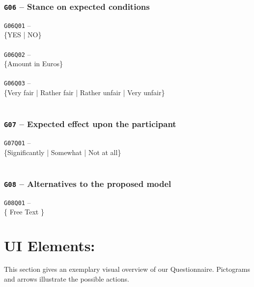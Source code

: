 \subsubsection{\texttt{G06} -- Stance on expected conditions}
\begin{displayquote}
    \texttt{G06Q01} -- \\
    \{YES | NO\}\\\\
    \texttt{G06Q02} -- \\
    \{Amount in Euros\}\\\\
    \texttt{G06Q03} -- \\
    \{Very fair | Rather fair | Rather unfair | Very unfair\}\\\\
\end{displayquote}

\subsubsection{\texttt{G07} -- Expected effect upon the participant}
\begin{displayquote}
    \texttt{G07Q01} -- \\
    \{Significantly | Somewhat | Not at all\}\\\\
\end{displayquote}

\subsubsection{\texttt{G08} -- Alternatives to the proposed model}
\begin{displayquote}
    \texttt{G08Q01} -- \\
    \{ Free Text \}
\end{displayquote}

\pagebreak

\section{UI Elements:}
This section gives an exemplary visual overview of our Questionnaire. Pictograms and arrows illustrate the possible actions.\\
\vspace{20pt}


